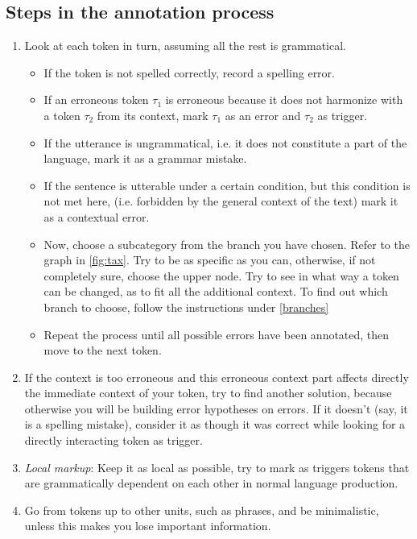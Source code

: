 \documentclass{article}
\begin{document}
\subsection{Steps in the annotation process}
\begin{enumerate}
\item Look at each token in turn, assuming all the rest is grammatical.
\begin{itemize}
  \item If the token is not spelled correctly, record a spelling error.
  \item If an erroneous token $\tau_1$ is erroneous because it does not
  harmonize with a token $\tau_2$
  from its context,  mark $\tau_1$ as an error and $\tau_2$ as trigger.
  \item If the utterance is ungrammatical, i.e. it does not constitute a part of
  the language, mark it as a grammar mistake.
  \item If the sentence is utterable under a certain condition, but this
  condition is not met here, (i.e. forbidden by the general context of the
  text) mark it as a contextual error.
  \item Now, choose a subcategory from the branch you have chosen. Refer to the
  graph in \ref{fig:tax}.
  Try to be as specific as you can, otherwise, if not completely sure, choose
  the upper node. Try to see in what way a token can be changed, as to
  fit all the additional context. To find out which branch to choose, follow the
  instructions under \ref{branches}
  \item Repeat the process until all possible errors have been annotated, then
  move to the next token.
\end{itemize}

  \item If the context is too erroneous and this erroneous context part affects
  directly the immediate context of your token, try to find another solution,
  because otherwise you will be building error hypotheses on errors. If it doesn't
  (say, it is a spelling mistake), consider it as though it was correct while
  looking for a directly interacting token as trigger.

\item \textit{Local markup}: Keep it as local as possible, try to mark as
triggers tokens that are grammatically dependent on each other in normal
language production.

\item Go from tokens up to other units, such as phrases, and be minimalistic, unless this makes you lose important information.


\end{enumerate}
\end{document}
